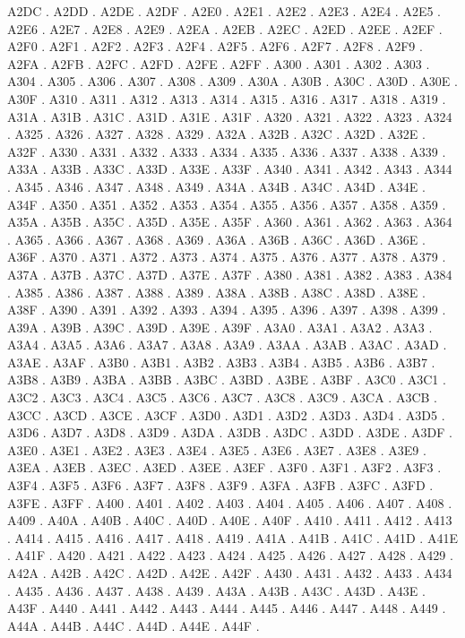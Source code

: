 A2DC .
A2DD .
A2DE .
A2DF .
A2E0 .
A2E1 .
A2E2 .
A2E3 .
A2E4 .
A2E5 .
A2E6 .
A2E7 .
A2E8 .
A2E9 .
A2EA .
A2EB .
A2EC .
A2ED .
A2EE .
A2EF .
A2F0 .
A2F1 .
A2F2 .
A2F3 .
A2F4 .
A2F5 .
A2F6 .
A2F7 .
A2F8 .
A2F9 .
A2FA .
A2FB .
A2FC .
A2FD .
A2FE .
A2FF .
A300 .
A301 .
A302 .
A303 .
A304 .
A305 .
A306 .
A307 .
A308 .
A309 .
A30A .
A30B .
A30C .
A30D .
A30E .
A30F .
A310 .
A311 .
A312 .
A313 .
A314 .
A315 .
A316 .
A317 .
A318 .
A319 .
A31A .
A31B .
A31C .
A31D .
A31E .
A31F .
A320 .
A321 .
A322 .
A323 .
A324 .
A325 .
A326 .
A327 .
A328 .
A329 .
A32A .
A32B .
A32C .
A32D .
A32E .
A32F .
A330 .
A331 .
A332 .
A333 .
A334 .
A335 .
A336 .
A337 .
A338 .
A339 .
A33A .
A33B .
A33C .
A33D .
A33E .
A33F .
A340 .
A341 .
A342 .
A343 .
A344 .
A345 .
A346 .
A347 .
A348 .
A349 .
A34A .
A34B .
A34C .
A34D .
A34E .
A34F .
A350 .
A351 .
A352 .
A353 .
A354 .
A355 .
A356 .
A357 .
A358 .
A359 .
A35A .
A35B .
A35C .
A35D .
A35E .
A35F .
A360 .
A361 .
A362 .
A363 .
A364 .
A365 .
A366 .
A367 .
A368 .
A369 .
A36A .
A36B .
A36C .
A36D .
A36E .
A36F .
A370 .
A371 .
A372 .
A373 .
A374 .
A375 .
A376 .
A377 .
A378 .
A379 .
A37A .
A37B .
A37C .
A37D .
A37E .
A37F .
A380 .
A381 .
A382 .
A383 .
A384 .
A385 .
A386 .
A387 .
A388 .
A389 .
A38A .
A38B .
A38C .
A38D .
A38E .
A38F .
A390 .
A391 .
A392 .
A393 .
A394 .
A395 .
A396 .
A397 .
A398 .
A399 .
A39A .
A39B .
A39C .
A39D .
A39E .
A39F .
A3A0 .
A3A1 .
A3A2 .
A3A3 .
A3A4 .
A3A5 .
A3A6 .
A3A7 .
A3A8 .
A3A9 .
A3AA .
A3AB .
A3AC .
A3AD .
A3AE .
A3AF .
A3B0 .
A3B1 .
A3B2 .
A3B3 .
A3B4 .
A3B5 .
A3B6 .
A3B7 .
A3B8 .
A3B9 .
A3BA .
A3BB .
A3BC .
A3BD .
A3BE .
A3BF .
A3C0 .
A3C1 .
A3C2 .
A3C3 .
A3C4 .
A3C5 .
A3C6 .
A3C7 .
A3C8 .
A3C9 .
A3CA .
A3CB .
A3CC .
A3CD .
A3CE .
A3CF .
A3D0 .
A3D1 .
A3D2 .
A3D3 .
A3D4 .
A3D5 .
A3D6 .
A3D7 .
A3D8 .
A3D9 .
A3DA .
A3DB .
A3DC .
A3DD .
A3DE .
A3DF .
A3E0 .
A3E1 .
A3E2 .
A3E3 .
A3E4 .
A3E5 .
A3E6 .
A3E7 .
A3E8 .
A3E9 .
A3EA .
A3EB .
A3EC .
A3ED .
A3EE .
A3EF .
A3F0 .
A3F1 .
A3F2 .
A3F3 .
A3F4 .
A3F5 .
A3F6 .
A3F7 .
A3F8 .
A3F9 .
A3FA .
A3FB .
A3FC .
A3FD .
A3FE .
A3FF .
A400 .
A401 .
A402 .
A403 .
A404 .
A405 .
A406 .
A407 .
A408 .
A409 .
A40A .
A40B .
A40C .
A40D .
A40E .
A40F .
A410 .
A411 .
A412 .
A413 .
A414 .
A415 .
A416 .
A417 .
A418 .
A419 .
A41A .
A41B .
A41C .
A41D .
A41E .
A41F .
A420 .
A421 .
A422 .
A423 .
A424 .
A425 .
A426 .
A427 .
A428 .
A429 .
A42A .
A42B .
A42C .
A42D .
A42E .
A42F .
A430 .
A431 .
A432 .
A433 .
A434 .
A435 .
A436 .
A437 .
A438 .
A439 .
A43A .
A43B .
A43C .
A43D .
A43E .
A43F .
A440 .
A441 .
A442 .
A443 .
A444 .
A445 .
A446 .
A447 .
A448 .
A449 .
A44A .
A44B .
A44C .
A44D .
A44E .
A44F .
